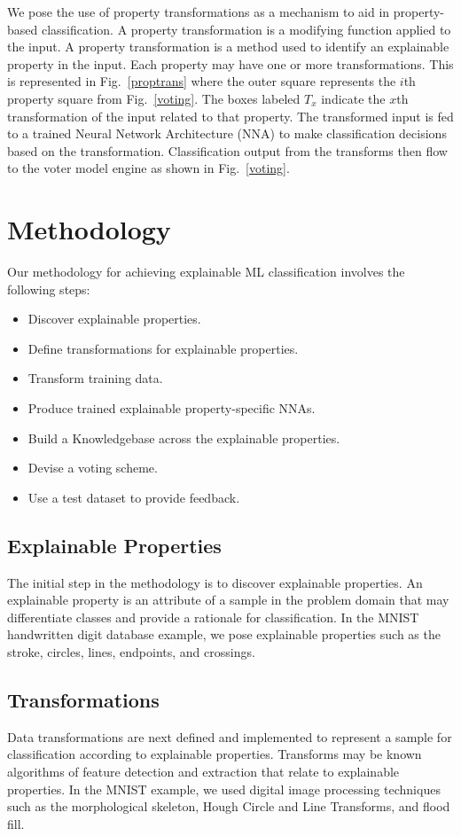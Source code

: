 \documentclass[conference]{IEEEtran}
\begin{document}
We pose the use of property transformations as a mechanism to aid in property-based classification.  A property transformation is a modifying function applied to the input.  A property transformation is a method used to identify an explainable property in the input.  Each property may have one or more transformations.   This is represented in Fig.~\ref{proptrans} where the outer square represents the $i$th property square from Fig.~\ref{voting}.  The boxes labeled $T_x$ indicate the $x$th transformation of the input related to that property.  The transformed input is fed to a trained Neural Network Architecture (NNA) to make classification decisions based on the transformation.  Classification output from the transforms then flow to the voter model engine as shown in Fig.~\ref{voting}.

\section{Methodology}
 
Our methodology for achieving explainable ML classification involves the following steps:
\begin{itemize}
\item Discover explainable properties.
\item Define transformations for explainable properties.
\item Transform training data.
\item Produce trained explainable property-specific NNAs.
\item Build a Knowledgebase across the explainable properties.
\item Devise a voting scheme.
\item Use a test dataset to provide feedback.
\end{itemize}

\subsection{Explainable Properties}
The initial step in the methodology is to discover explainable properties.   An explainable property is an attribute of a sample in the problem domain that may differentiate classes and provide a rationale for classification.  In the MNIST handwritten digit database example, we pose explainable properties such as the stroke, circles, lines, endpoints, and crossings.

\subsection{Transformations}
Data transformations are next defined and implemented to represent a sample for classification according to  explainable properties.  Transforms may be known algorithms of feature detection and extraction that relate to explainable properties.  In the MNIST example, we used digital image processing techniques such as the morphological skeleton, Hough Circle and Line Transforms, and flood fill.
\end{document}
